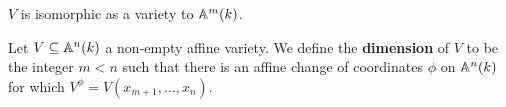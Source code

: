 
\begin{corollary}
  $V$ is isomorphic as a variety to  $\mathbb{A}^m(k)$.
\end{corollary}

\begin{definition}
  Let $V \subseteq \mathbb{A}^n(k)$ a non-empty affine variety. We define the
  \textbf{dimension} of $V$ to be the integer $m<n$ such that there is an affine
  change of coordinates $\phi$ on $\mathbb{A}^n(k)$ for which $V^\phi=V(x_{m+1}, \dots,
  x_n)$.
\end{definition}

